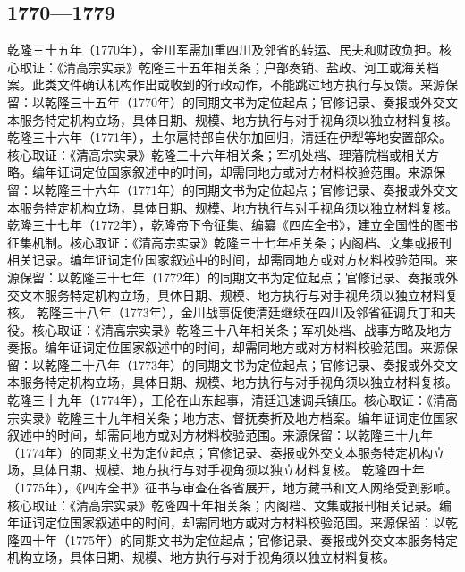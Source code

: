 \subsection{1770—1779}
乾隆三十五年（1770年），金川军需加重四川及邻省的转运、民夫和财政负担。核心取证：《清高宗实录》乾隆三十五年相关条；户部奏销、盐政、河工或海关档案。此类文件确认机构作出或收到的行政动作，不能跳过地方执行与反馈。来源保留：以乾隆三十五年（1770年）的同期文书为定位起点；官修记录、奏报或外交文本服务特定机构立场，具体日期、规模、地方执行与对手视角须以独立材料复核。
乾隆三十六年（1771年），土尔扈特部自伏尔加回归，清廷在伊犁等地安置部众。核心取证：《清高宗实录》乾隆三十六年相关条；军机处档、理藩院档或相关方略。编年证词定位国家叙述中的时间，却需同地方或对方材料校验范围。来源保留：以乾隆三十六年（1771年）的同期文书为定位起点；官修记录、奏报或外交文本服务特定机构立场，具体日期、规模、地方执行与对手视角须以独立材料复核。
乾隆三十七年（1772年），乾隆帝下令征集、编纂《四库全书》，建立全国性的图书征集机制。核心取证：《清高宗实录》乾隆三十七年相关条；内阁档、文集或报刊相关记录。编年证词定位国家叙述中的时间，却需同地方或对方材料校验范围。来源保留：以乾隆三十七年（1772年）的同期文书为定位起点；官修记录、奏报或外交文本服务特定机构立场，具体日期、规模、地方执行与对手视角须以独立材料复核。
乾隆三十八年（1773年），金川战事促使清廷继续在四川及邻省征调兵丁和夫役。核心取证：《清高宗实录》乾隆三十八年相关条；军机处档、战事方略及地方奏报。编年证词定位国家叙述中的时间，却需同地方或对方材料校验范围。来源保留：以乾隆三十八年（1773年）的同期文书为定位起点；官修记录、奏报或外交文本服务特定机构立场，具体日期、规模、地方执行与对手视角须以独立材料复核。
乾隆三十九年（1774年），王伦在山东起事，清廷迅速调兵镇压。核心取证：《清高宗实录》乾隆三十九年相关条；地方志、督抚奏折及地方档案。编年证词定位国家叙述中的时间，却需同地方或对方材料校验范围。来源保留：以乾隆三十九年（1774年）的同期文书为定位起点；官修记录、奏报或外交文本服务特定机构立场，具体日期、规模、地方执行与对手视角须以独立材料复核。
乾隆四十年（1775年），《四库全书》征书与审查在各省展开，地方藏书和文人网络受到影响。核心取证：《清高宗实录》乾隆四十年相关条；内阁档、文集或报刊相关记录。编年证词定位国家叙述中的时间，却需同地方或对方材料校验范围。来源保留：以乾隆四十年（1775年）的同期文书为定位起点；官修记录、奏报或外交文本服务特定机构立场，具体日期、规模、地方执行与对手视角须以独立材料复核。
